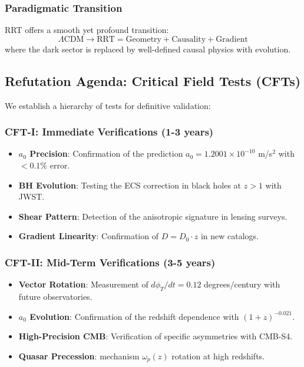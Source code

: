\documentclass[12pt,a4paper]{article}
\begin{document}
\subsubsection{Paradigmatic Transition}
RRT offers a smooth yet profound transition:
\begin{equation}
    \Lambda\text{CDM} \rightarrow \text{RRT} = \text{Geometry} + \text{Causality} + \text{Gradient}
\end{equation}
where the dark sector is replaced by well-defined causal physics with evolution.

\subsection{Refutation Agenda: Critical Field Tests (CFTs)}
We establish a hierarchy of tests for definitive validation:

\subsubsection{CFT-I: Immediate Verifications (1-3 years)}
\begin{itemize}
    \item \textbf{$a_0$ Precision}: Confirmation of the prediction $a_0 = 1.2001 \times 10^{-10}$ m/s$^2$ with $< 0.1\%$ error.
    \item \textbf{BH Evolution}: Testing the ECS correction in black holes at $z > 1$ with JWST.
    \item \textbf{Shear Pattern}: Detection of the anisotropic signature in lensing surveys.
    \item \textbf{Gradient Linearity}: Confirmation of $D = D_0 \cdot z$ in new catalogs.
\end{itemize}

\subsubsection{CFT-II: Mid-Term Verifications (3-5 years)}
\begin{itemize}
    \item \textbf{Vector Rotation}: Measurement of $d\phi_T/dt = 0.12$ degrees/century with future observatories.
    \item \textbf{$a_0$ Evolution}: Confirmation of the redshift dependence with $(1+z)^{-0.021}$.
    \item \textbf{High-Precision CMB}: Verification of specific asymmetries with CMB-S4.
    \item \textbf{Quasar Precession}: mechanism $\omega_p(z)$ rotation at high redshifts.
\end{itemize}
\end{document}
